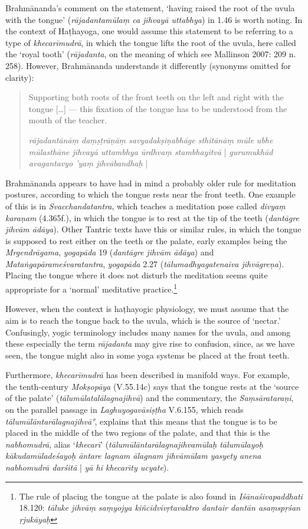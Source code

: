 \begin{ekdosis}
\begin{philcomm}[hp01_045]
Brahmānanda's comment on the statement, `having raised the root of the uvula with the tongue' (\emph{rājadantamūlaṃ ca jihvayā uttabhya}) in 1.46 is worth noting. In the context of Haṭhayoga, one would assume this statement to be referring to a type of  \emph{khecarīmudrā}, in which the tongue lifts the root of the uvula, here called the `royal tooth' (\emph{rājadanta}, on the meaning of which see Mallinson 2007: 209 n. 258). However, Brahmānanda understands it differently (synonyms omitted for clarity): 
\begin{quote}
Supporting both roots of the front teeth on the left and right with the tongue [\ldots] — this fixation of the tongue has to be understood from the mouth of the teacher.

\emph{rājadantānāṃ daṃṣṭrāṇāṃ savyadakṣiṇabhāge sthitānāṃ mūle ubhe mūlasthāne jihvayā uttambhya ūrdhvaṃ stambhayitvā} | \emph{gurumukhād avagantavyo 'yaṃ jihvābandhaḥ} |
\end{quote}
Brahmānanda appears to have had in mind a probably older rule for meditation postures, according to which the tongue rests near the front teeth. One example of this is in \emph{Svacchandatantra}, which teaches a meditation pose called \emph{divyaṃ karaṇam} (4.365f.), in which the tongue is to rest at the tip
of the teeth (\emph{dantāgre jihvām ādāya}). Other Tantric texts have this or similar rules, in which the tongue is supposed to rest either on the teeth or the palate, early examples being the \emph{Mrgendrāgama}, \textit{yogapāda} 19 (\emph{dantāgre jihvām ādāya}) and \emph{Mataṅgapārameśvaratantra}, \textit{yogapāda} 2.27 (\emph{tālumadhyagatenaiva jihvāgreṇa}).
Placing the tongue where it does not disturb the meditation seems quite appropriate for a `normal' meditative practice.\footnote{The rule of placing the tongue at the palate is also found in \emph{Iśānaśivapaddhati} 18.120: \emph{tāluke jihvāṃ saṃyojya kiñcidvivṛtavaktro dantair dantān asaṃspṛśan ṛjukāyaḥ}}

However, when the context is haṭhayogic physiology, we must assume that the aim is to reach the tongue back to the uvula, which is the source of `nectar.' Confusingly, yogic terminology includes many names for the uvula, and among these especially the term \emph{rājadanta} may give rise to confusion, since, as we have seen, the tongue might also in some yoga systems be placed at the front teeth.

Furthermore, \emph{khecarīmudrā} has been described in manifold ways. For example, the tenth-century \emph{Mokṣopāya} (V.55.14c) says that the tongue rests at the `source of the palate' (\emph{tālumūlatalālagnajihvā}) and the commentary, the
\emph{Saṃsārataraṇi}, on the parallel passage in \emph{Laghuyogavāsiṣṭha} V.6.155, which reads \emph{tālumūlāntarālagnajihvā°}, explains that this means that the tongue is to be placed in the middle of the two regions of the palate, and that this is the \emph{nabhomudrā}, alias `\emph{khecarī}' (\emph{tālumūlāntarālagnajihvamūlaḥ tālumūlayoḥ kākudamūladeśayoḥ āntare lagnam ālagnam jihvāmūlam yasyety anena nabhomudrā darśitā} | \emph{yā hi khecarı̄ty ucyate}).


\end{philcomm}
\end{ekdosis}
